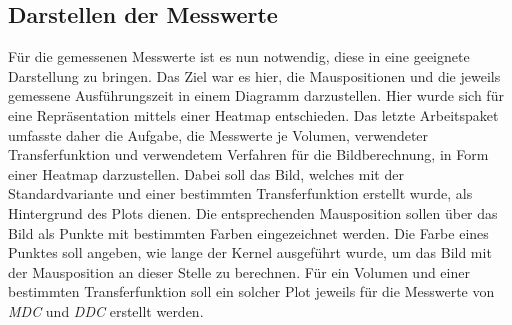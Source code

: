 \subsection{Darstellen der Messwerte}
Für die gemessenen Messwerte ist es nun notwendig, diese in eine geeignete Darstellung zu bringen.
Das Ziel war es hier, die Mauspositionen und die jeweils gemessene Ausführungszeit in einem Diagramm darzustellen.
Hier wurde sich für eine Repräsentation mittels einer Heatmap entschieden.
Das letzte Arbeitspaket umfasste daher die Aufgabe, die Messwerte je Volumen, verwendeter Transferfunktion und verwendetem Verfahren für die Bildberechnung, in Form einer Heatmap darzustellen.
Dabei soll das Bild, welches mit der Standardvariante und einer bestimmten Transferfunktion erstellt wurde, als Hintergrund des Plots dienen.
Die entsprechenden Mausposition sollen über das Bild als Punkte mit bestimmten Farben eingezeichnet werden.
Die Farbe eines Punktes soll angeben, wie lange der Kernel ausgeführt wurde, um das Bild mit der Mausposition an dieser Stelle zu berechnen.
Für ein Volumen und einer bestimmten Transferfunktion soll ein solcher Plot jeweils für die Messwerte von \emph{MDC} und \emph{DDC} erstellt werden.
